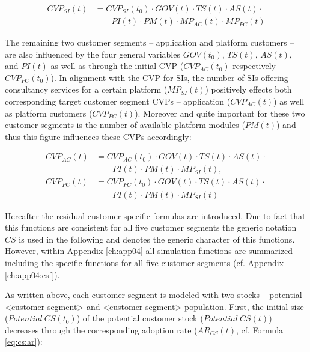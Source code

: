 \begin{align}
		CVP_{SI}(t) &= CVP_{SI}(t_0) \cdot GOV(t) \cdot TS(t) \cdot AS(t) \cdot \nonumber \\ &\qquad PI(t) \cdot PM(t) \cdot MP_{AC}(t) \cdot MP_{PC}(t)\label{eq:cvp:si}
\end{align}

The remaining two customer segments -- application and platform customers -- are also influenced by the four general variables $GOV(t_0)$, $TS(t)$, $AS(t)$, and $PI(t)$ as well as through the initial \ac{CVP} ($CVP_{AC}(t_0)$ respectively $CVP_{PC}(t_0)$). In alignment with the \ac{CVP} for \acp{SI}, the number of \acp{SI} offering consultancy services for a certain platform ($MP_{SI}(t)$) positively effects both corresponding target customer segment \acp{CVP} -- application ($CVP_{AC}(t)$) as well as platform customers ($CVP_{PC}(t)$). Moreover and quite important for these two customer segments is the number of available platform modules ($PM(t)$) and thus this figure influences these \acp{CVP} accordingly:

\begin{align}
		CVP_{AC}(t) &= CVP_{AC}(t_0) \cdot GOV(t) \cdot TS(t) \cdot AS(t) \cdot \nonumber \\ &\qquad PI(t) \cdot PM(t) \cdot MP_{SI}(t),\label{eq:cvp:ac}\\
		CVP_ {PC}(t) &= CVP_{PC}(t_0) \cdot GOV(t) \cdot TS(t) \cdot AS(t) \cdot \nonumber \\ &\qquad PI(t) \cdot PM(t) \cdot MP_{SI}(t)\label{eq:cvp:pc}
\end{align}

Hereafter the residual customer-specific formulas are introduced. Due to fact that this functions are consistent for all five customer segments the generic notation $CS$ is used in the following and denotes the generic character of this functions. However, within Appendix \ref{ch:app04} all simulation functions are summarized including the specific functions for all five customer segments (cf. Appendix \ref{ch:app04:csf}).

As written above, each customer segment is modeled with two stocks -- potential <customer segment> and <customer segment> population. First, the initial size ($\mathit{Potential~CS(t_0)}$) of the potential customer stock \linebreak ($\mathit{Potential~CS(t)}$) decreases through the corresponding adoption rate \linebreak ($AR_{CS}(t)$, cf. Formula \ref{eq:cs:ar}):

